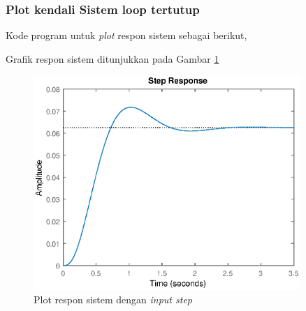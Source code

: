 \documentclass[../main.tex]{subfiles}
\begin{document}
            \subsubsection{Plot kendali Sistem loop tertutup}
                Kode program untuk \textit{plot} respon sistem sebagai berikut,
                
                Grafik respon sistem ditunjukkan pada Gambar \ref{plot_respon_sistem_1}
                \begin{figure}[H]
                    \centering
                    \includegraphics[width = 0.9\textwidth]{assets/image/UJI_SISTEM_1_1_rev.eps}
                    \caption{Plot respon sistem dengan \textit{input step}}
                    \label{plot_respon_sistem_1}
                \end{figure}
\end{document}
